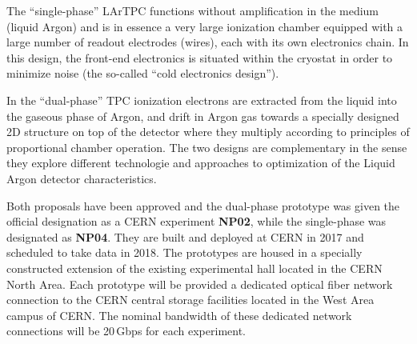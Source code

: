 \documentclass[12pt]{article}
\begin{document}
The ``single-phase''  LArTPC functions without amplification in the medium (liquid Argon) and is in essence a very large ionization chamber
equipped with a large number of readout electrodes (wires), each with its own electronics chain. In this design, the front-end electronics is
situated within the cryostat in order to minimize noise (the so-called ``cold electronics design'').

In the ``dual-phase''  TPC ionization
electrons are extracted from the liquid into the gaseous phase of Argon, and drift in Argon gas towards a specially designed 2D structure
on top of the detector where they multiply according to principles of proportional chamber operation. The two designs are complementary
in the sense they explore different technologie and approaches to optimization of the Liquid Argon detector characteristics.

Both  proposals have been approved and the dual-phase prototype was given the official designation as a CERN experiment \textbf{NP02},
while the single-phase was designated as \textbf{NP04}. They are built and deployed at CERN in 2017 and scheduled to take data in 2018.
The prototypes are housed in a specially constructed extension of the existing experimental hall located in the CERN North Area.
Each prototype will be provided a dedicated optical fiber network connection to the CERN central storage facilities located in the West Area
campus of CERN. The nominal bandwidth of these dedicated network connections will be 20\,Gbps for each experiment.

\end{document}
